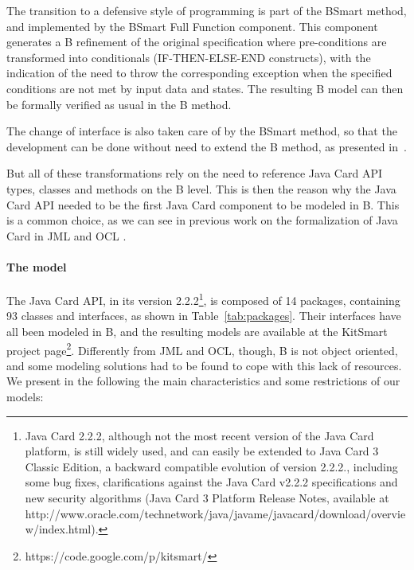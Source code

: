 \documentclass{entcs}
\begin{document}
The transition to a defensive style of programming is part of the
BSmart method, and implemented by the BSmart Full Function
component. This component generates a B refinement of the original
specification where pre-conditions are transformed into conditionals
(IF-THEN-ELSE-END constructs), with the indication of the need to
throw the corresponding exception when the specified conditions are
not met by input data and states.  The resulting B model can then be
formally verified as usual in the B method.

The change of interface is also taken care of by the BSmart method, so
that the development can be done without need to extend the B
method, as presented in~\cite{Gomes10}.

But all of these transformations rely on the need to reference Java
Card API types, classes and methods on the B level.  This is then the
reason why the Java Card API needed to be the first Java Card
component to be modeled in B. This is a common choice, as we can see in previous work on the formalization of 
Java Card in JML \cite{pollBerg01} and OCL \cite{Larsson:2004}. 

\paragraph{The model}
The Java Card API, in its version 2.2.2\footnote{Java Card 2.2.2,
  although not the most recent version of the Java Card platform, is
  still widely used, and can easily be extended to Java Card 3 Classic
  Edition, a backward compatible evolution of version 2.2.2.,
  including some bug fixes, clarifications against the Java Card
  v2.2.2 specifications and new security algorithms (Java Card 3
  Platform Release Notes, available at
  http://www.oracle.com/technetwork/java/javame/javacard/download/overview/index.html).}, is composed of 14
packages, containing 93 classes and interfaces, as shown in
Table~\ref{tab:packages}. Their interfaces have all been modeled in B,
and the resulting models are available at the KitSmart project
page\footnote{https://code.google.com/p/kitsmart/}.  Differently from
JML and OCL, though, B is not object oriented, and some modeling
solutions had to be found to cope with this lack of resources.  We
present in the following the main characteristics and some
restrictions of our models:
\end{document}
